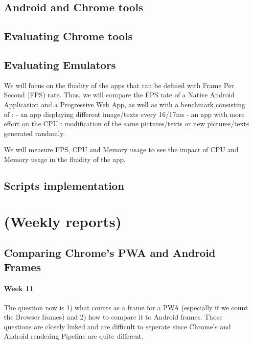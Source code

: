 \documentclass{kththesis}
\begin{document}
    \subsection{Android and Chrome tools}
    \subsection{Evaluating Chrome tools}
    \subsection{Evaluating Emulators}

We will focus on the fluidity of the apps that can be defined with Frame Per Second (FPS) rate.
Thus, we will compare the FPS rate of a Native Android Application and a Progressive Web App, as well as with a benchmark consisting of : 
    - an app displaying different image/texts every 16/17ms
    - an app with more effort on the CPU : modification of the same pictures/texts or new pictures/texts generated randomly.
\newline

We will measure FPS, CPU and Memory usage to see the impact of CPU and Memory usage in the fluidity of the app.
\newline

\subsection{Scripts implementation}

\iffalse
\section{(Weekly reports)}
\subsection{Comparing Chrome's PWA and Android Frames}
\paragraph{Week 11}
The question now is 1) what counts as a frame for a PWA (especially if we count the Browser frames) and 2) how to compare it to Android frames.
Those questions are closely linked and are difficult to seperate since Chrome's and Android rendering Pipeline are quite different.
\end{document}
